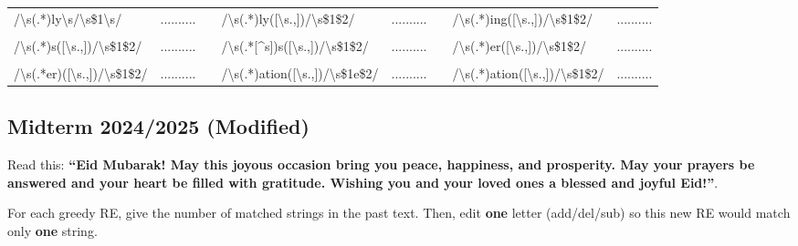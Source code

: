 \documentclass{../extra/aakpract/aakpract}
\begin{document}
	\begin{center}
		\begin{tabular}{|l|l|l|l|l|l|l|l|}
			\cline{1-2}\cline{4-5}\cline{7-8}
			/\textbackslash s(.*)ly\textbackslash s/\textbackslash s\$1\textbackslash s/ & .......... &&
			/\textbackslash s(.*)ly([\textbackslash s.,])/\textbackslash s\$1\$2/ & .......... &&
			/\textbackslash s(.*)ing([\textbackslash s.,])/\textbackslash s\$1\$2/ & .......... \\
			\cline{1-2}\cline{4-5}\cline{7-8}
			\multicolumn{8}{c}{}\\
			\cline{1-2}\cline{4-5}\cline{7-8}
			/\textbackslash s(.*)s([\textbackslash s.,])/\textbackslash s\$1\$2/ & .......... &&
			/\textbackslash s(.*[\textasciicircum s])s([\textbackslash s.,])/\textbackslash s\$1\$2/ & .......... &&
			/\textbackslash s(.*)er([\textbackslash s.,])/\textbackslash s\$1\$2/ & .......... \\
			\cline{1-2}\cline{4-5}\cline{7-8}
			\multicolumn{8}{c}{}\\
			\cline{1-2}\cline{4-5}\cline{7-8}
			/\textbackslash s(.*er)([\textbackslash s.,])/\textbackslash s\$1\$2/ & .......... &&
			/\textbackslash s(.*)ation([\textbackslash s.,])/\textbackslash s\$1e\$2/ & .......... &&
			/\textbackslash s(.*)ation([\textbackslash s.,])/\textbackslash s\$1\$2/ & .......... \\
			\cline{1-2}\cline{4-5}\cline{7-8}
		\end{tabular}
	\end{center}
	
	\subsection{Midterm 2024/2025 (Modified)}
	
	Read this: \textbf{``Eid Mubarak! May this joyous occasion bring you peace, happiness, and prosperity. May your prayers be answered and your heart be filled with gratitude. Wishing you and your loved ones a blessed and joyful Eid!''}.
	
	For each greedy RE, give the number of matched strings in the past text.  Then, edit \textbf{one} letter (add/del/sub) so this new RE would match only \textbf{one} string. 
	
\end{document}

